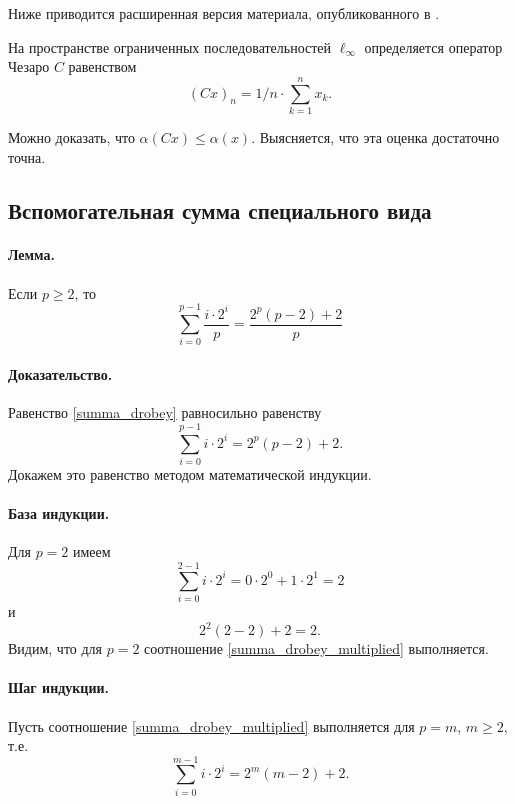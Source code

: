 Ниже приводится расширенная версия материала, опубликованного в
\cite{our-vzms-2018}.

На пространстве ограниченных последовательностей $\ell_\infty$ определяется оператор Чезаро $C$
равенством
\begin{equation}
	(Cx)_n = {1}/{n} \cdot \sum_{k=1}^n x_k
	.
\end{equation}

Можно доказать, что
$\alpha(Cx) \leqslant \alpha(x)$.
Выясняется, что эта оценка достаточно точна.

\subsection{Вспомогательная сумма специального вида}
\paragraph{Лемма.}
Если $p\geq 2$, то
\begin{equation}\label{summa_drobey}
	\sum_{i=0}^{p-1} \frac{i \cdot 2^i}{p} = \frac{2^p(p-2) + 2}{p}
\end{equation}


\paragraph{Доказательство.}
Равенство \eqref{summa_drobey} равносильно равенству
\begin{equation}\label{summa_drobey_multiplied}
	\sum_{i=0}^{p-1} i \cdot 2^i = 2^p(p-2) + 2
	.
\end{equation}
Докажем это равенство методом математической индукции.

\paragraph{База индукции.}
Для $p=2$ имеем
\begin{equation}
	\sum_{i=0}^{2-1} i \cdot 2^i = 0 \cdot 2^0 + 1 \cdot 2^1 = 2
\end{equation}
и
\begin{equation}
	2^2(2-2) + 2 = 2
	.
\end{equation}
Видим, что для $p=2$ соотношение \eqref{summa_drobey_multiplied} выполняется.

\paragraph{Шаг индукции.}
Пусть соотношение \eqref{summa_drobey_multiplied} выполняется для $p=m$, $m\geq 2$, т.е.
\begin{equation}\label{summa_drobey_multiplied_m}
	\sum_{i=0}^{m-1} i \cdot 2^i = 2^m(m-2) + 2
	.
\end{equation}

